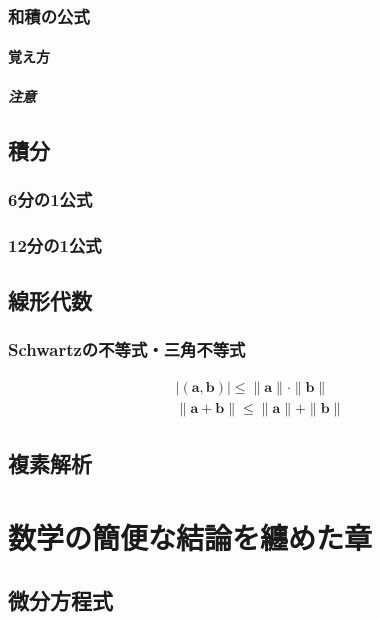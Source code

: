 \documentclass[]{jreport}
\begin{document}
\section{和積の公式}
\subsection{覚え方}
\subsubsection{注意}

\chapter{積分}

\section{6分の1公式}

\section{12分の1公式}

\chapter{線形代数}

\section{Schwartzの不等式・三角不等式}
\begin{equation}
    \begin{array}{l}
        |(\bm{a}, \bm{b})|\le\|\bm{a}\|\cdot\|\bm{b}\|\\
        \|\bm{a}+\bm{b}\|\le\|\bm{a}\|+\|\bm{b}\|
    \end{array}
\end{equation}

\chapter{複素解析}

\part{数学の簡便な結論を纏めた章}

\chapter{微分方程式}
\end{document}
